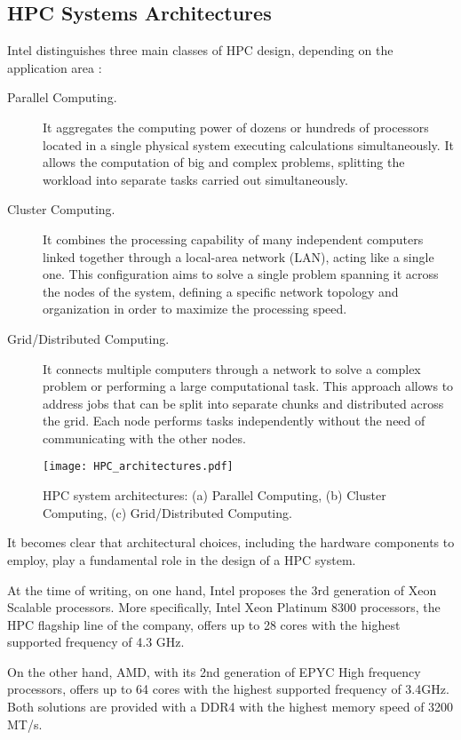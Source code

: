 \subsection{HPC Systems Architectures}
Intel distinguishes three main classes of HPC design, depending on the application area \cite{intel}:
\begin{description}
\item [Parallel Computing.] It aggregates the computing power of dozens or hundreds of processors located in a single physical system executing calculations simultaneously. It allows the computation of big and complex problems, splitting the workload into separate tasks carried out simultaneously.
\item [Cluster Computing.] It combines the processing capability of many independent computers linked together through a local-area network (LAN), acting like a single one. This configuration aims to solve a single problem spanning it across the nodes of the system, defining a specific network topology and organization in order to maximize the processing speed.
\item [Grid/Distributed Computing.] It connects multiple computers through a network to solve a complex problem or performing a large computational task. This approach allows to address jobs that can be split into separate chunks and distributed across the grid. Each node performs tasks independently without the need of communicating with the other nodes. 
\end{description}

\begin{figure}[t]
    \centering
    \texttt{[image: HPC\_architectures.pdf]}
    \caption{HPC system architectures: (a) Parallel Computing, (b) Cluster Computing, (c) Grid/Distributed Computing.}
    \label{fig:hpcarch}
\end{figure}

It becomes clear that architectural choices, including the hardware components to employ, play a fundamental role in the design of a HPC system.

At the time of writing, on one hand, Intel proposes the 3rd generation of Xeon Scalable processors. More specifically, Intel Xeon Platinum 8300 processors, the HPC flagship line of the company, offers up to 28 cores with the highest supported frequency of 4.3 GHz.

On the other hand, AMD, with its 2nd generation of EPYC High frequency processors, offers up to 64 cores with the highest supported frequency of 3.4GHz. Both solutions are provided with a DDR4 with the highest memory speed of 3200 MT/s.

